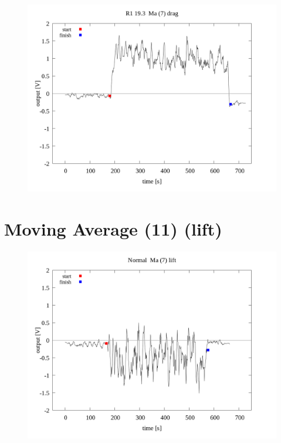 \documentclass[a4paper]{jsarticle}
\begin{document}
\begin{figure}[htbp]
    \footnotesize
    \begin{center}
        \includegraphics[width=140mm]{../../../../33_result/210806/moving_average/7/drag/02/R1_19.3_ma(7)_drag_02.png}
    \end{center}
\end{figure}

\section{Moving Average (11) (lift)}

\begin{figure}[htbp]
    \footnotesize
    \begin{center}
        \includegraphics[width=140mm]{../../../../33_result/210806/moving_average/7/lift/02/Normal_ma(7)_lift_02.png}
    \end{center}
\end{figure}
\end{document}
